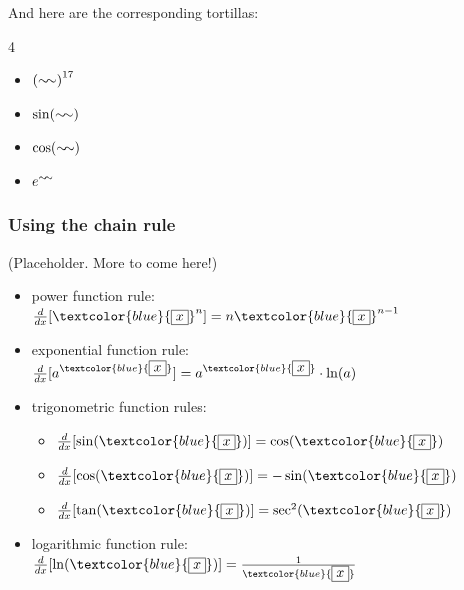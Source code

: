 And here are the corresponding tortillas:

{\renewcommand{\blue}[1]{\squiggle}
\begin{multicols}{4}
    \begin{itemize}
        \item $\left(\blue{4z^3+77}\right)^{17}$
        \item $\sin(\blue{7x})$
        \item $\cos(\blue{\ln(x)})$
        \item $e^{\blue{2x+6}}$
    \end{itemize}
\end{multicols}
}

\subsubsection*{Using the chain rule}

(Placeholder. More to come here!)




\begin{minipage}{0.55\textwidth}
    \everymath{\displaystyle}
    \newcommand{\x}{\textcolor{blue}{\boxed{x}}}
    \newcommand{\diff}[1]{\frac{d}{d#1}}
    \begin{itemize}[label=\(\square\)]
        \item power function rule: $\diff{x}[\x^n] = n\x^{n-1}$
        \item exponential function rule: $\diff{x}[a^{\x}] = a^{\x}\cdot\ln(a)$
        \item[] trigonometric function rules: 
        \begin{itemize}[label=\(\bigcirc\)]
            \item $\diff{x}[\sin(\x)] = \cos(\x)$
            \item $\diff{x}[\cos(\x)] = -\sin(\x)$
            \item $\diff{x}[\tan(\x)] = \sec^2(\x)$
        \end{itemize}
        \item logarithmic function rule: $\diff{x}[\ln(\x)] = \frac{1}{\x}$
    \end{itemize}
\end{minipage}